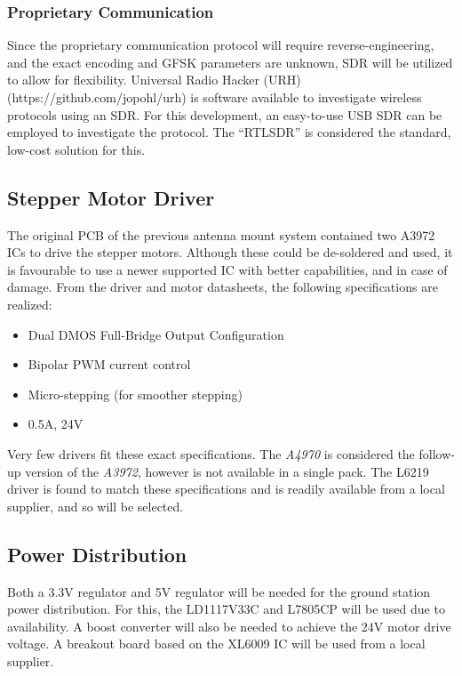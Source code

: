 \subsubsection{Proprietary Communication}
Since the proprietary communication protocol will require reverse-engineering, and the exact encoding and GFSK parameters are unknown, SDR will be utilized to allow for flexibility. Universal Radio Hacker (URH) (https://github.com/jopohl/urh) is software available to investigate wireless protocols using an SDR. For this development, an easy-to-use USB SDR can be employed to investigate the protocol. The “RTLSDR” is considered the standard, low-cost solution for this.

\subsection{Stepper Motor Driver}
The original PCB of the previous antenna mount system contained two A3972 ICs to drive the stepper motors. Although these could be de-soldered and used, it is favourable to use a newer supported IC with better capabilities, and in case of damage. From the driver and motor datasheets, the following specifications are realized:
\begin{itemize}
    \item Dual DMOS Full-Bridge Output Configuration
    \item Bipolar PWM current control
    \item Micro-stepping (for smoother stepping)
    \item 0.5A, 24V
\end{itemize}

Very few drivers fit these exact specifications. The \textit{A4970} is considered the follow-up version of the \textit{A3972}, however is not available in a single pack. The L6219 driver is found to match these specifications and is readily available from a local supplier, and so will be selected.

\subsection{Power Distribution}
Both a 3.3V regulator and 5V regulator will be needed for the ground station power distribution. For this, the LD1117V33C and L7805CP will be used due to availability. A boost converter will also be needed to achieve the 24V motor drive voltage. A breakout board based on the XL6009 IC will be used from a local supplier.

